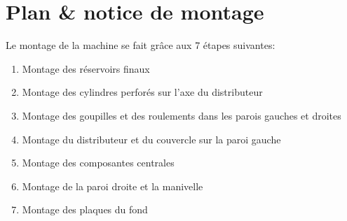 \chapter{Plan \& notice de montage}
Le montage de la machine se fait grâce aux 7 étapes suivantes:

\begin{enumerate}
    \item Montage des réservoirs finaux
    \item Montage des cylindres perforés sur l'axe du distributeur
    \item Montage des goupilles et des roulements dans les parois gauches et droites
    \item Montage du distributeur et du couvercle sur la paroi gauche
    \item Montage des composantes centrales
    \item Montage de la paroi droite et la manivelle
    \item Montage des plaques du fond
\end{enumerate}

\newpage

